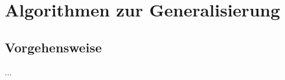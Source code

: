 \documentclass[../main/thesis.tex]{subfiles}
\begin{document}
\chapter{Algorithmen zur Generalisierung}

\section{Vorgehensweise}

...



\end{document}
